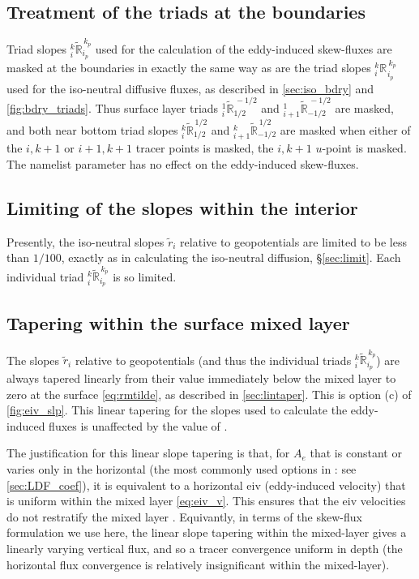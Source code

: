 \documentclass[../main/NEMO_manual]{subfiles}
\newcommand{\triad}[6][]{\ensuremath{{}_{#2}^{#3}{\mathbb{#4}_{#1}}_{#5}^{\,#6}}}
\newcommand{\triadt}[5]{\ensuremath{{}_{#1}^{#2}{\tilde{\mathbb{#3}}}_{#4}^{\,#5}}}
\newcommand{\rtriad}[2][]{\ensuremath{\triad[#1]{i}{k}{#2}{i_p}{k_p}}}
\newcommand{\rtriadt}[1]{\ensuremath{\triadt{i}{k}{#1}{i_p}{k_p}}}
\begin{document}
\subsection{Treatment of the triads at the boundaries}
\label{sec:skew_bdry}

Triad slopes \rtriadt{R} used for the calculation of the eddy-induced skew-fluxes are masked at the boundaries 
in exactly the same way as are the triad slopes \rtriad{R} used for the iso-neutral diffusive fluxes, 
as described in \autoref{sec:iso_bdry} and \autoref{fig:bdry_triads}. 
Thus surface layer triads $\triadt{i}{1}{R}{1/2}{-1/2}$ and $\triadt{i+1}{1}{R}{-1/2}{-1/2}$ are masked, 
and both near bottom triad slopes $\triadt{i}{k}{R}{1/2}{1/2}$ and $\triadt{i+1}{k}{R}{-1/2}{1/2}$ are masked when 
either of the $i,k+1$ or $i+1,k+1$ tracer points is masked, \ie the $i,k+1$ $u$-point is masked. 
The namelist parameter  has no effect on the eddy-induced skew-fluxes.

\subsection{Limiting of the slopes within the interior}
\label{sec:limitskew}

Presently, the iso-neutral slopes $\tilde{r}_i$ relative to geopotentials are limited to be less than $1/100$, 
exactly as in calculating the iso-neutral diffusion, \S \autoref{sec:limit}. 
Each individual triad \rtriadt{R} is so limited.

\subsection{Tapering within the surface mixed layer}
\label{sec:taperskew}

The slopes $\tilde{r}_i$ relative to geopotentials (and thus the individual triads \rtriadt{R}) 
are always tapered linearly from their value immediately below the mixed layer to zero at the surface 
\autoref{eq:rmtilde}, as described in \autoref{sec:lintaper}. 
This is option (c) of \autoref{fig:eiv_slp}. 
This linear tapering for the slopes used to calculate the eddy-induced fluxes is unaffected by 
the value of .

The justification for this linear slope tapering is that, for $A_e$ that is constant or varies only in
the horizontal (the most commonly used options in \NEMO: see \autoref{sec:LDF_coef}),
it is equivalent to a horizontal eiv (eddy-induced velocity) that is uniform within the mixed layer
\autoref{eq:eiv_v}.
This ensures that the eiv velocities do not restratify the mixed layer \citep{Treguier1997,Danabasoglu_al_2008}.
Equivantly, in terms of the skew-flux formulation we use here,
the linear slope tapering within the mixed-layer gives a linearly varying vertical flux,
and so a tracer convergence uniform in depth
(the horizontal flux convergence is relatively insignificant within the mixed-layer).
\end{document}
